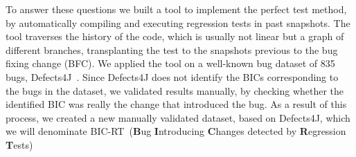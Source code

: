 \newcommand{\datasetName}[0]{BIC-RT}
To answer these questions we built a tool to implement the perfect test method, by automatically compiling and executing regression tests in past snapshots. The tool traverses the history of the code, which is usually not linear but a graph of different branches, transplanting the test to the snapshots previous to the bug fixing change (BFC). We applied the tool  on a well-known bug dataset of 835 bugs, Defects4J~\cite{just2014defects4j}. 
Since Defects4J does not identify the BICs corresponding to the bugs in the dataset, we validated results manually, by checking whether the identified BIC was really the change that introduced the bug.
As a result of this process, we created a new manually validated dataset, based on Defects4J, which we will denominate \datasetName~(\textbf{B}ug \textbf{I}ntroducing \textbf{C}hanges detected by \textbf{R}egression \textbf{T}ests)




